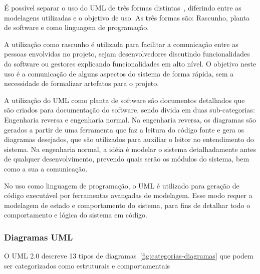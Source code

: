 É possível separar o uso do UML de três formas distintas~\cite{fowler04}, diferindo entre as modelagens utilizadas e o objetivo de uso. As três formas são: Rascunho, planta de software e como linguagem de programação. 

A utilização como rascunho é utilizada para facilitar a comunicação entre as pessoas envolvidas no projeto, sejam desenvolvedores discutindo funcionalidades do software ou gestores explicando funcionalidades em alto nível. O objetivo neste uso é a comunicação de alguns aspectos do sistema de forma rápida, sem a necessidade de formalizar artefatos para o projeto.

A utilização do UML como planta de software são documentos detalhados que são criados para documentação do software, sendo divida em duas sub-categorias: Engenharia reversa e engenharia normal. Na engenharia reversa, os diagramas são gerados a partir de uma ferramenta que faz a leitura do código fonte e gera os diagramas desejados, que são utilizados para auxiliar o leitor no entendimento do sistema. Na engenharia normal, a idéia é modelar o sistema detalhadamente antes de qualquer desenvolvimento, prevendo quais serão os módulos do sistema, bem como a sua a comunicação.

No uso como linguagem de programação, o UML é utilizado para geração de código executável por ferramentas avançadas de modelagem. Esse modo requer a modelagem de estado e comportamento do sistema, para fins de detalhar todo o comportamento e lógica do sistema em código.

\subsubsection{Diagramas UML}

O UML 2.0 descreve 13 tipos de diagramas~\ref{fig:categorias-diagramas} que podem ser categorizados como estruturais e comportamentais

